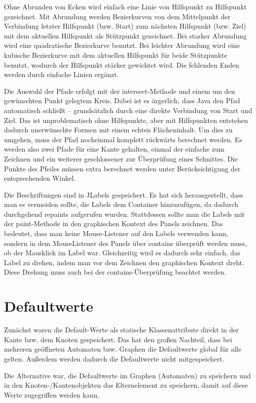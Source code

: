 Ohne Abrunden von Ecken wird einfach eine Linie von Hilfspunkt zu Hilfspunkt gezeichnet. Mit Abrundung werden Bezierkurven von dem Mittelpunkt der Verbindung letzter Hilfspunkt (bzw. Start) zum nächsten Hilfspunkt (bzw. Ziel) mit dem aktuellen Hilfspunkt als Stützpunkt gezeichnet. Bei starker Abrundung wird eine quadratische Bezierkurve benutzt. Bei leichter Abrundung wird eine kubische Bezierkurve mit dem aktuellen Hilfspunkt für beide Stützpunkte benutzt, wodurch der Hilfspunkt stärker gewichtet wird. Die fehlenden Enden werden durch einfache Linien ergänzt.

Die Auswahl der Pfade erfolgt mit der intersect-Methode und einem um den gewünschten Punkt gelegtem Kreis. Dabei ist es ärgerlich, dass Java den Pfad automatisch schließt -- grundsätzlich durch eine direkte Verbindung von Start und Ziel. Das ist unproblematisch ohne Hilfspunkte, aber mit Hilfspunkten entstehen dadurch unerwünschte Formen mit einem echten Flächeninhalt. Um dies zu umgehen, muss der Pfad nocheinmal komplett rückwärts berechnet werden. Es werden also zwei Pfade für eine Kante gehalten, einmal der einfache zum Zeichnen und ein weiterer geschlossener zur Überprüfung eines Schnittes. Die Punkte des Pfeiles müssen extra berechnet werden unter Berücksichtigung der entsprechenden Winkel.

Die Beschriftungen sind in JLabels gespeichert. Es hat sich herausgestellt, dass man es vermeiden sollte, die Labels dem Container hinzuzufügen, da dadurch durchgehend repaints aufgerufen wurden. Stattdessen sollte man die Labels mit der paint-Methode in den graphischen Kontext des Panels zeichnen. Das bedeutet, dass man keine Mouse-Listener auf den Labels verwenden kann, sondern in dem MouseListener des Panels über contains überprüft werden muss, ob der Mausklick im Label war. Gleichzeitig wird es dadurch sehr einfach, das Label zu drehen, indem man vor dem Zeichnen den graphischen Kontext dreht. Diese Drehung muss auch bei der contains-Überprüfung beachtet werden.
\section{Defaultwerte}
Zunächst waren die Default-Werte als statische Klassenattribute direkt in der Kante bzw. dem Knoten gespeichert. Das hat den großen Nachteil, dass bei mehreren geöffneten Automaten bzw. Graphen die Defaultwerte global für alle gelten. Außerdem werden dadurch die Defaultwerte nicht mitgespeichert.

Die Alternative war, die Defaultwerte im Graphen (Automaten) zu speichern und in den Knoten-/Kantenobjekten das Elternelement zu speichern, damit auf diese Werte zugegriffen werden kann.

